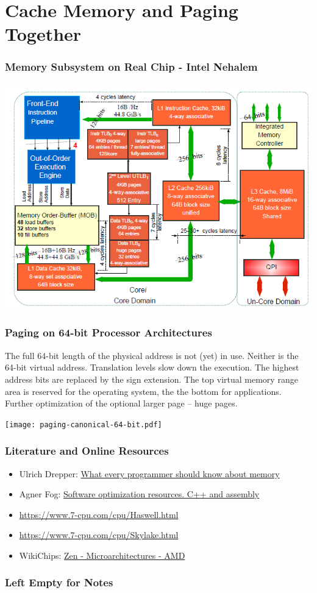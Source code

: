 \documentclass{beamer}
\begin{document}
\section{Cache Memory and Paging Together}

\begin{frame}
\frametitle{Memory Subsystem on Real Chip - Intel Nehalem}

{
\centering

\includegraphics[width=0.80\linewidth]{fig/mem-nehalem-lat.png}

}

\end{frame}

\begin{frame}
\frametitle{Paging on 64-bit Processor Architectures}

The full 64-bit length of the physical address is not (yet) in use.
Neither is the 64-bit virtual address. Translation levels slow down the execution.
The highest address bits are replaced by the sign extension.
The top virtual memory range area is reserved for the operating system, the the bottom for applications.
Further optimization of the optional larger page -- huge pages.

{
\centering

\texttt{[image: paging-canonical-64-bit.pdf]}

}
\end{frame}

\begin{frame}
\frametitle{Literature and Online Resources}

\begin{itemize}
\item Ulrich Drepper: \href{https://lwn.net/Articles/250967/}{What every programmer should know about memory}
\item Agner Fog: \href{https://www.agner.org/optimize/}{Software optimization resources. C++ and assembly}
\item \url{https://www.7-cpu.com/cpu/Haswell.html}
\item \url{https://www.7-cpu.com/cpu/Skylake.html}
\item WikiChips: \href{https://en.wikichip.org/wiki/amd/microarchitectures/zen}{Zen - Microarchitectures - AMD}

\end{itemize}

\end{frame}

\begin{frame}
\frametitle{Left Empty for Notes}

\end{frame}
\end{document}
